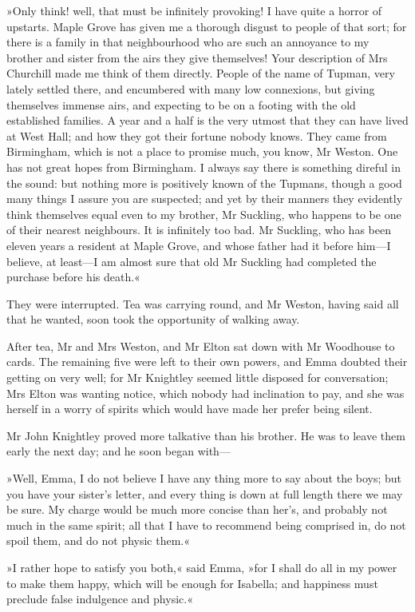 »Only think! well, that must be infinitely provoking! I have quite a horror of upstarts. Maple Grove has given me a thorough disgust to people of that sort; for there is a family in that neighbourhood who are such an annoyance to my brother and sister from the airs they give themselves! Your description of Mrs Churchill made me think of them directly. People of the name of Tupman, very lately settled there, and encumbered with many low connexions, but giving themselves immense airs, and expecting to be on a footing with the old established families. A year and a half is the very utmost that they can have lived at West Hall; and how they got their fortune nobody knows. They came from Birmingham, which is not a place to promise much, you know, Mr Weston. One has not great hopes from Birmingham. I always say there is something direful in the sound: but nothing more is positively known of the Tupmans, though a good many things I assure you are suspected; and yet by their manners they evidently think themselves equal even to my brother, Mr Suckling, who happens to be one of their nearest neighbours. It is infinitely too bad. Mr Suckling, who has been eleven years a resident at Maple Grove, and whose father had it before him—I believe, at least—I am almost sure that old Mr Suckling had completed the purchase before his death.«

They were interrupted. Tea was carrying round, and Mr Weston, having said all that he wanted, soon took the opportunity of walking away.

After tea, Mr and Mrs Weston, and Mr Elton sat down with Mr Woodhouse to cards. The remaining five were left to their own powers, and Emma doubted their getting on very well; for Mr Knightley seemed little disposed for conversation; Mrs Elton was wanting notice, which nobody had inclination to pay, and she was herself in a worry of spirits which would have made her prefer being silent.

Mr John Knightley proved more talkative than his brother. He was to leave them early the next day; and he soon began with—

»Well, Emma, I do not believe I have any thing more to say about the boys; but you have your sister's letter, and every thing is down at full length there we may be sure. My charge would be much more concise than her's, and probably not much in the same spirit; all that I have to recommend being comprised in, do not spoil them, and do not physic them.«

»I rather hope to satisfy you both,« said Emma, »for I shall do all in my power to make them happy, which will be enough for Isabella; and happiness must preclude false indulgence and physic.«

